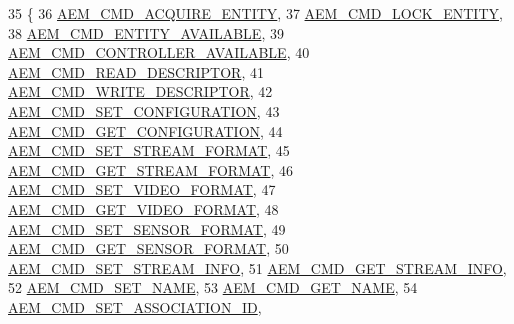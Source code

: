 \begin{DoxyCode}
35 \{
36     \hyperlink{namespaceavdecc__lib_a1631d53b37995d16b597a5e1a78c55a5a4380655f320ea7d90aae73aee9f4b0db}{AEM\_CMD\_ACQUIRE\_ENTITY},
37     \hyperlink{namespaceavdecc__lib_a1631d53b37995d16b597a5e1a78c55a5a232963dd7f478c6bcdc9251ab34d9b49}{AEM\_CMD\_LOCK\_ENTITY},
38     \hyperlink{namespaceavdecc__lib_a1631d53b37995d16b597a5e1a78c55a5ae7d184a5b20659bf394f13b4137e2e9c}{AEM\_CMD\_ENTITY\_AVAILABLE},
39     \hyperlink{namespaceavdecc__lib_a1631d53b37995d16b597a5e1a78c55a5a566da9ba4bdd44ee9dc3e565b342c3b1}{AEM\_CMD\_CONTROLLER\_AVAILABLE},
40     \hyperlink{namespaceavdecc__lib_a1631d53b37995d16b597a5e1a78c55a5a072a93ad9a8e9d7386eb2572bc0c7654}{AEM\_CMD\_READ\_DESCRIPTOR},
41     \hyperlink{namespaceavdecc__lib_a1631d53b37995d16b597a5e1a78c55a5a17701972ca091debf4474971f494543e}{AEM\_CMD\_WRITE\_DESCRIPTOR},
42     \hyperlink{namespaceavdecc__lib_a1631d53b37995d16b597a5e1a78c55a5a5134fc482edafa6590c07376f1f46267}{AEM\_CMD\_SET\_CONFIGURATION},
43     \hyperlink{namespaceavdecc__lib_a1631d53b37995d16b597a5e1a78c55a5a1d6b86e7baad199941750fef13bb497a}{AEM\_CMD\_GET\_CONFIGURATION},
44     \hyperlink{namespaceavdecc__lib_a1631d53b37995d16b597a5e1a78c55a5a8829a20eda7bc78710495033864d2f90}{AEM\_CMD\_SET\_STREAM\_FORMAT},
45     \hyperlink{namespaceavdecc__lib_a1631d53b37995d16b597a5e1a78c55a5a9f362079c9ce2d86622ac52d52ae98a2}{AEM\_CMD\_GET\_STREAM\_FORMAT},
46     \hyperlink{namespaceavdecc__lib_a1631d53b37995d16b597a5e1a78c55a5aabde866cc35cb1ec3d50290e6e75f741}{AEM\_CMD\_SET\_VIDEO\_FORMAT},
47     \hyperlink{namespaceavdecc__lib_a1631d53b37995d16b597a5e1a78c55a5a75111cddea2c8840015b11693369b334}{AEM\_CMD\_GET\_VIDEO\_FORMAT},
48     \hyperlink{namespaceavdecc__lib_a1631d53b37995d16b597a5e1a78c55a5a4e5b6d952b7535ee9806e3349c30f763}{AEM\_CMD\_SET\_SENSOR\_FORMAT},
49     \hyperlink{namespaceavdecc__lib_a1631d53b37995d16b597a5e1a78c55a5ad3f09d8a3dec91fe0071e622fa36f654}{AEM\_CMD\_GET\_SENSOR\_FORMAT},
50     \hyperlink{namespaceavdecc__lib_a1631d53b37995d16b597a5e1a78c55a5ae438065f307a57bc6c21a501d7421efe}{AEM\_CMD\_SET\_STREAM\_INFO},
51     \hyperlink{namespaceavdecc__lib_a1631d53b37995d16b597a5e1a78c55a5aef5fce5b1fcf4961ef986eea8616af05}{AEM\_CMD\_GET\_STREAM\_INFO},
52     \hyperlink{namespaceavdecc__lib_a1631d53b37995d16b597a5e1a78c55a5a10173d7756774fa80495d49f23bc5562}{AEM\_CMD\_SET\_NAME},
53     \hyperlink{namespaceavdecc__lib_a1631d53b37995d16b597a5e1a78c55a5ab4a931fa73abe99db261cab2ab61151b}{AEM\_CMD\_GET\_NAME},
54     \hyperlink{namespaceavdecc__lib_a1631d53b37995d16b597a5e1a78c55a5ab89c67adbf3a255e87779a8d34448eb3}{AEM\_CMD\_SET\_ASSOCIATION\_ID},

\end{DoxyCode}

